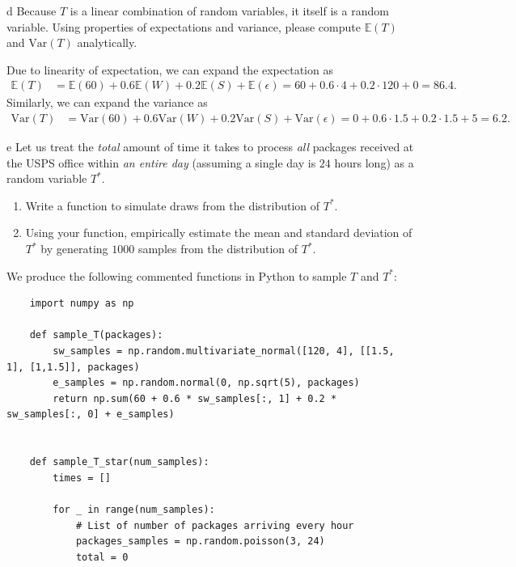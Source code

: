 \documentclass[expanded]{pset}
\begin{document}
\begin{parts}
  \begin{part}{d}
    Because $T$ is a linear combination of random variables, it itself is a random variable. Using properties of expectations and variance, please compute $\mathbb{E}(T)$ and $\mathrm{Var}(T)$ analytically.
  \end{part}

  Due to linearity of expectation, we can expand the expectation as
  \[
    \begin{aligned}
      \mathbb{E}(T) &= \mathbb{E}(60)+0.6\mathbb{E}(W) + 0.2\mathbb{E}(S)+\mathbb{E}(\epsilon) = 60+0.6\cdot 4 + 0.2\cdot 120 + 0 = 86.4.
    \end{aligned}
  \]
  Similarly, we can expand the variance as 
  \[
    \begin{aligned}
      \mathrm{Var}(T) &= \mathrm{Var}(60)+0.6\mathrm{Var}(W) + 0.2\mathrm{Var}(S)+\mathrm{Var}(\epsilon) = 0 + 0.6\cdot 1.5 + 0.2\cdot 1.5 + 5 = 6.2.
    \end{aligned}
  \]

  \begin{part}{e}
     Let us treat the \textit{total} amount of time it takes to process \textit{all} packages received at the USPS office within \textit{an entire day} (assuming a single day is $24$ hours long) as a random variable $T^{*}$. 
    \begin{enumerate}
        \item Write a function to simulate draws from the distribution of $T^{*}$. 
        \item Using your function, empirically estimate the mean and standard deviation of $T^{*}$ by generating $1000$ samples from the distribution of $T^{*}$.
    \end{enumerate}
  \end{part}

  We produce the following commented functions in Python to sample $T$ and $T^*$:
  \begin{verbatim}
    import numpy as np

    def sample_T(packages):
        sw_samples = np.random.multivariate_normal([120, 4], [[1.5, 1], [1,1.5]], packages)
        e_samples = np.random.normal(0, np.sqrt(5), packages)
        return np.sum(60 + 0.6 * sw_samples[:, 1] + 0.2 * sw_samples[:, 0] + e_samples)


    def sample_T_star(num_samples):
        times = []

        for _ in range(num_samples):
            # List of number of packages arriving every hour
            packages_samples = np.random.poisson(3, 24)
            total = 0


\end{verbatim}
\end{parts}
\end{document}
